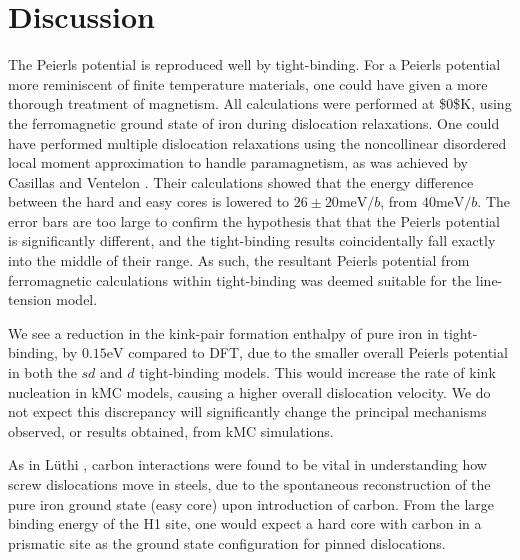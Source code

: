 \documentclass[a4paper,11pt]{article}
\begin{document}
\section{Discussion}
\label{sec:org48f11b3}
\label{sec:discussion}





The Peierls potential is reproduced well by tight-binding. For a Peierls potential more
reminiscent of finite temperature materials, one could have given a more thorough treatment of
magnetism. All calculations were performed at \$0\textdegree{}\$K, using the ferromagnetic ground state of
iron during dislocation relaxations. One could have performed multiple dislocation relaxations
using the noncollinear disordered local moment approximation to handle paramagnetism, as was
achieved by Casillas and Ventelon \cite{Casillas-Trujillo2020}. Their calculations showed that the
energy difference between the hard and easy cores is lowered to \(26 \pm 20\text{meV/}b\), from
\(40 \text{meV/}b\). The error bars are too large to confirm the hypothesis that that the Peierls
potential is significantly different, and the tight-binding results coincidentally fall exactly
into the middle of their range. As such, the resultant Peierls potential from ferromagnetic
calculations within tight-binding was deemed suitable for the line-tension model.

We see a reduction in the kink-pair formation enthalpy of pure iron in tight-binding,
by \(0.15 \text{eV}\) compared to DFT, due to the smaller overall Peierls potential in
both the \(sd\) and \(d\) tight-binding models. This would increase the rate of kink
nucleation in kMC models, causing a higher overall dislocation velocity. We do not
expect this discrepancy will significantly change the principal mechanisms observed,
or results obtained, from kMC simulations.


As in Lüthi \cite{Lthi2019}, carbon interactions were found to be vital in understanding how screw
dislocations move in steels, due to the spontaneous reconstruction of the pure iron ground state
(easy core) upon introduction of carbon. From the large binding energy of the H1 site, one would
expect a hard core with carbon in a prismatic site as the ground state configuration for pinned
dislocations.
\end{document}
